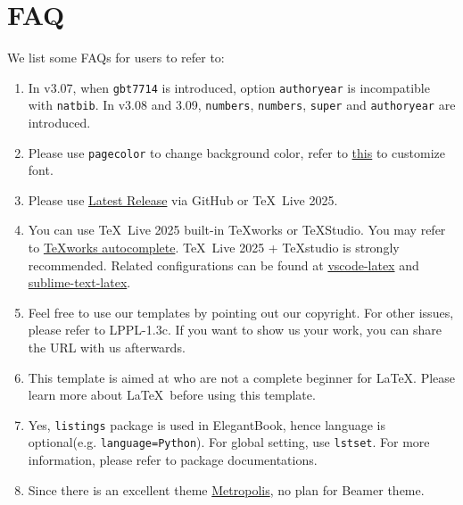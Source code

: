 \documentclass[11pt]{elegantbook}
\begin{document}
\chapter{FAQ}
We list some FAQs for users to refer to:
\begin{enumerate}
  \item {}
  In v3.07, when \lstinline{gbt7714} is introduced, option \lstinline{authoryear} is incompatible with \lstinline{natbib}. In v3.08 and 3.09, \lstinline{numbers}, \lstinline{numbers}, \lstinline{super} and \lstinline{authoryear} are introduced.
  \item {}
  Please use \lstinline{pagecolor} to change background color, refer to \href{https://tex.stackexchange.com/questions/278544/xcolor-what-is-the-equivalent-of-default-text-color}{this} to customize font.
  \item {}
  Please use \href{https://github.com/ElegantLaTeX/ElegantBook/releases}{Latest Release} via GitHub or \TeX~Live 2025.
  \item {}
  You can use \TeX~Live 2025 built-in \TeX works or \TeX Studio. You may refer to \href{https://github.com/EthanDeng/texworks-autocomplete}{\TeX works autocomplete}. \TeX~Live 2025 + \TeX studio is strongly recommended. Related configurations can be found at \href{https://github.com/EthanDeng/vscode-latex}{vscode-latex} and \href{https://github.com/EthanDeng/sublime-text-latex}{sublime-text-latex}.
  \item {}
  Feel free to use our templates by pointing out our copyright. For other issues, please refer to LPPL-1.3c. If you want to show us your work, you can share the URL with us afterwards.
  \item {}
  This template is aimed at who are not a complete beginner for \LaTeX. Please learn more about \LaTeX\ before using this template.
  \item {}
  Yes, \lstinline{listings} package is used in ElegantBook, hence language is optional(e.g. \lstinline{language=Python}). For global setting, use \lstinline{lstset}. For more information, please refer to package documentations.
  \item {}
  Since there is an excellent theme \href{https://github.com/matze/mtheme}{Metropolis}, no plan for Beamer theme.
\end{enumerate}
\end{document}
